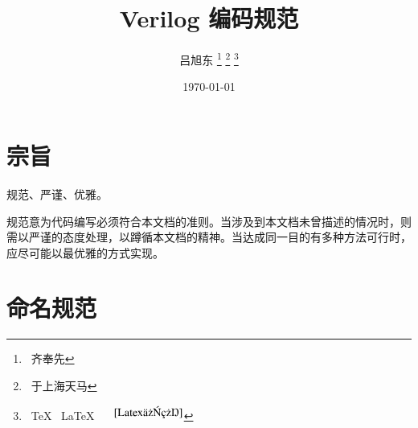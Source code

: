 \documentclass[utf-8, 10pt, a4paper, titlepage, oneside, onecolumn, openany]{ctexart} %
\begin{document}
	\renewcommand{\thefootnote}{\fnsymbol{footnote}} %


	\title{\textbf{Verilog 编码规范}} %
	\author{吕旭东 \thanks{~齐奉先} \footnote{~于上海天马} \footnote{~\TeX ~ \LaTeX ~ \LaTeXe ~ \XeLaTeX $^{\cite{Latex介绍}}$}} %
	\date{\today} %
	\maketitle %

	\tableofcontents {}	%
	\clearpage %

	\renewcommand{\thefootnote}{\arabic{footnote}} %


	\section{宗旨}
		规范、严谨、优雅。
		
		规范意为代码编写必须符合本文档的准则。当涉及到本文档未曾描述的情况时，则需以严谨的态度处理，以蹲循本文档的精神。当达成同一目的有多种方法可行时，应尽可能以最优雅的方式实现。
		
	\section{命名规范}
\end{document}

